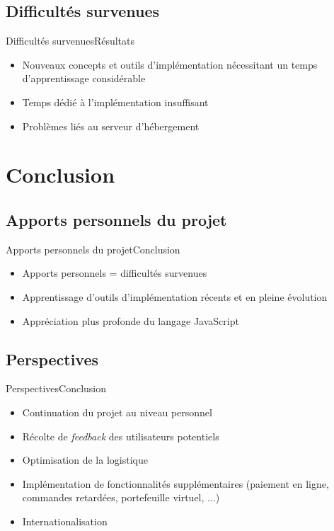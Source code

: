 \documentclass[usenames,dvipsnames]{beamer}
\begin{document}
\subsection{Difficultés survenues}
\begin{frame}{Difficultés survenues}{Résultats}
  \begin{itemize}
    \item Nouveaux concepts et outils d'implémentation nécessitant un temps d'apprentissage considérable
    \item Temps dédié à l'implémentation insuffisant
    \item Problèmes liés au serveur d'hébergement
  \end{itemize}
\end{frame}
\section{Conclusion}
\subsection{Apports personnels du projet}
\begin{frame}{Apports personnels du projet}{Conclusion}
  \begin{itemize}
    \item Apports personnels = difficultés survenues
    \item Apprentissage d'outils d'implémentation récents et en pleine évolution
    \item Appréciation plus profonde du langage JavaScript
  \end{itemize}
\end{frame}

\subsection{Perspectives}
\begin{frame}{Perspectives}{Conclusion}
  \begin{itemize}
    \item Continuation du projet au niveau personnel
    \item Récolte de \textit{feedback} des utilisateurs potentiels
    \item Optimisation de la logistique
    \item Implémentation de fonctionnalités supplémentaires (paiement en ligne, commandes retardées, portefeuille virtuel, $\dots$)
    \item Internationalisation
 \end{itemize}
\end{frame}
\end{document}
